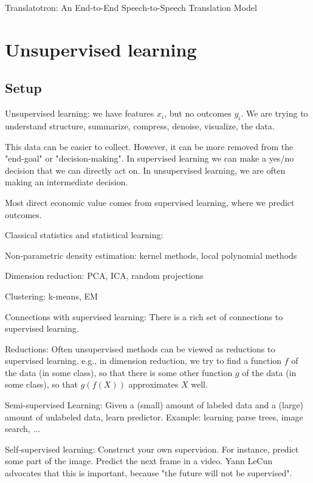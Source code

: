 \documentclass[english]{article}
\begin{document}
Translatotron: An End-to-End Speech-to-Speech Translation Model


\eenum 

\section{Unsupervised learning}

\subsection{Setup}

\benum
\item Unsupervised learning: we have features $x_i$, but no outcomes $y_i$. We are trying to understand structure, summarize, compress, denoise, visualize, the data.

This data can be easier to collect. However, it can be more removed from the "end-goal" or "decision-making". In supervised learning we can make a yes/no decision that we can directly act on. In unsupervised learning, we are often making an intermediate decision. 

Most direct economic value comes from supervised learning, where we predict outcomes.


\item Classical statistics and statistical learning: 

Non-parametric density estimation: kernel methods, local polynomial methods

Dimension reduction: PCA, ICA, random projections

Clustering: k-means, EM


\item Connections with supervised learning: There is a rich set of connections to supervised learning. 

Reductions: Often unsupervised methods can be viewed as reductions to supervised learning. e.g., in dimension reduction, we try to find a function $f$ of the data (in some class), so that there is some other function $g$ of the data (in some class), so that $g(f(X))$ approximates $X$ well. 

Semi-supervised Learning: Given a (small) amount of labeled data and a (large) amount of unlabeled data, learn predictor. Example: learning parse trees, image search, ...

Self-supervised learning: Construct your own supervision. For instance, predict some part of the image. Predict the next frame in a video. Yann LeCun advocates that this is important, because "the future will not be supervised".
\end{document}
